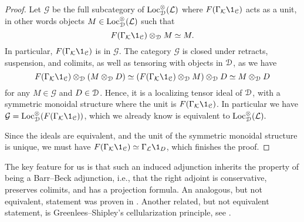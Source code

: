 \begin{proof}
    Let $\mathcal{G}$ be the full subcategory of $\operatorname{Loc}_{\EuScript{D}}^\otimes(\mathcal{L})$ where $F(\Gamma_\K\1_\C)$ acts as a unit, in other words objects $M\in \operatorname{Loc}_{\EuScript{D}}^\otimes(\mathcal{L})$ such that 
    \[F(\Gamma_\K\1_\C)\otimes_{\D} M\simeq M.\] 
    In particular, $F(\Gamma_\K\1_\C)$ is in $\mathcal{G}$. The category $\mathcal{G}$ is closed under retracts, suspension, and colimits, as well as tensoring with objects in $\EuScript{D}$, as we have 
    \[F(\Gamma_\K\1_\C) \otimes_\D (M\otimes_\D D)\simeq (F(\Gamma_\K\1_\C)\otimes_\D M) \otimes_\D D \simeq M\otimes_\D D\]
    for any $M\in \mathcal{G}$ and $D\in \EuScript{D}$. Hence, it is a localizing tensor ideal of $\EuScript{D}$, with a symmetric monoidal structure where the unit is $F(\Gamma_\K\1_\C)$. In particular we have $\mathcal{G} = \Loc_\D^\otimes(F(\Gamma_\K\1_\C))$, which we already know is equivalent to $\operatorname{Loc}_{\EuScript{D}}^\otimes(\mathcal{L}).$
    
    Since the ideals are equivalent, and the unit of the symmetric monoidal structure is unique, we must have $F(\Gamma_\K\1_\C)\simeq \Gamma_\L \1_D$, which finishes the proof. 
\end{proof}

The key feature for us is that such an induced adjunction inherits the property of being a Barr--Beck adjunction, i.e., that the right adjoint is conservative, preserves colimits, and has a projection formula. An analogous, but not equivalent, statement was proven in \cite[4.5]{behrens-shaw_2020}. Another related, but not equivalent statement, is Greenlees--Shipley's cellularization principle, see \cite{greenlees-shipley_2013}. 

